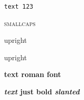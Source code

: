 \documentclass[12pt]{article}
\newcommand\"{quote}
\begin{document}
\texttt{text 123}

\textsc{smallcaps}

\textup{upright}


\textmd{upright}


\textbf{text \textrm{roman font}}

\textbf{\textit{text} just bold \textsl{slanted}}
\end{document}
